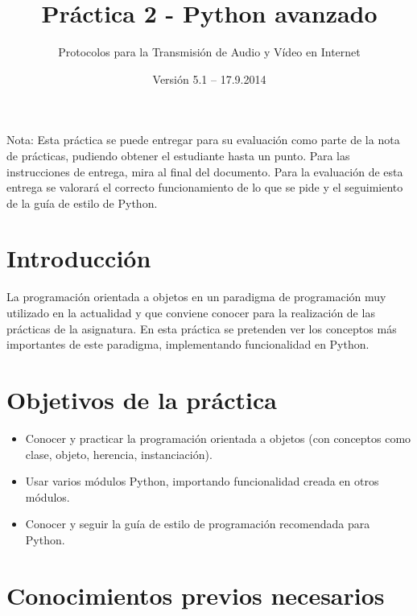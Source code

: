 \documentclass[11pt,a4paper]{article}
\begin{document}
\title{Práctica 2 - Python avanzado}
\author{Protocolos para la Transmisión de Audio y Vídeo en Internet}
\date{Versión 5.1 – 17.9.2014}


\maketitle


Nota: Esta práctica se puede entregar para su evaluación como parte de la nota de prácticas, pudiendo obtener el estudiante hasta un punto. Para las instrucciones de entrega, mira al final del documento. Para la evaluación de esta entrega se valorará el correcto funcionamiento de lo que se pide y el seguimiento de la guía de estilo de Python.

\section{Introducción}

La programación orientada a objetos en un paradigma de programación muy utilizado en la actualidad y que conviene conocer para la realización de las prácticas de la asignatura. En esta práctica se pretenden ver los conceptos más importantes de este paradigma, implementando funcionalidad en Python.


\section{Objetivos de la práctica}

\begin{itemize}
  \item Conocer y practicar la programación orientada a objetos (con conceptos como clase, objeto, herencia, instanciación).
  \item Usar varios módulos Python, importando funcionalidad creada en otros módulos.
  \item Conocer y seguir la guía de estilo de programación recomendada para Python.
\end{itemize}

\section{Conocimientos previos necesarios}
\end{document}
